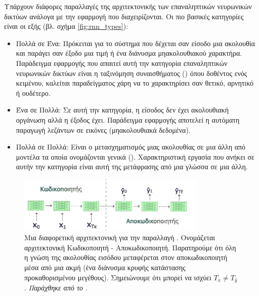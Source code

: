 Υπάρχουν διάφορες παραλλαγές της αρχιτεκτονικής των επαναληπτικών νευρωνικών δικτύων ανάλογα με την εφαρμογή που διαχειρίζονται. Οι πιο βασικές κατηγορίες είναι οι εξής (βλ. σχήμα \ref{fig:rnn_types}):
\begin{itemize}
  \item Πολλά σε Ένα: Πρόκειται για το σύστημα που δέχεται σαν είσοδο μια ακολουθία και παράγει σαν έξοδο μια τιμή ή ένα διάνυσμα μη\textendash ακολουθιακού χαρακτήρα. Παράδειγμα εφαρμογής που απαιτεί αυτή την κατηγορία επαναληπτικών νευρωνικών δικτύων είναι η ταξινόμηση συναισθήματος () όπου δοθέντος ενός κειμένου, καλείται παραδείγματος χάρη να το χαρακτηρίσει σαν θετικό, αρνητικό ή ουδέτερο.
  \item Ένα σε Πολλά: Σε αυτή την κατηγορία, η είσοδος δεν έχει ακολουθιακή οργάνωση αλλά η έξοδος έχει. Παράδειγμα εφαρμογής αποτελεί η αυτόματη παραγωγή λεζάντων σε εικόνες (μη\textendash ακολουθιακά δεδομένα).
  \item Πολλά σε Πολλά: Είναι ο μετασχηματισμός μιας ακολουθίας σε μια άλλη από μοντέλα τα οποία ονομάζονται γενικά  (). Χαρακτηριστική εργασία που ανήκει σε αυτήν την κατηγορία είναι αυτή της μετάφρασης από μια γλώσσα σε μια άλλη.
\end{itemize}\par

\begin{figure}[h]
  \centering
  \includegraphics[width=0.8\textwidth]{images/chapter theoritical background/rnn_many_to_many_encoder_decoder_gr.pdf}
  \caption{Μια διαφορετική αρχιτεκτονική για την παραλλαγή . Ονομάζεται αρχιτεκτονική Κωδικοποιητή - Αποκωδικοποιητή. Παρατηρούμε ότι όλη η γνώση της ακολουθίας εισόδου μεταφέρεται στον αποκωδικοποιητή μέσα από μια ακμή (ένα διάνυσμα κρυφής κατάστασης προκαθορισμένου μεγέθους). Σημειώνουμε ότι μπορεί να ισχύει $T_x \neq T_{\hat{y}}$. \textit{Παράχθηκε από το \href{https://inkscape.org/}{}}.}
  \label{fig:rnn_enc_dec}
\end{figure}

